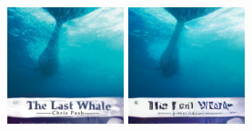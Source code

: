 \begin{figure}[h]
    \centering
    {\small
    }
    \vspace{5pt} 
    
    \begin{minipage}{0.15\textwidth}
        \centering
        \includegraphics[width=\linewidth]{material/origin/2.png}
    \end{minipage}
    \begin{minipage}{0.15\textwidth}
        \centering
        \includegraphics[width=\linewidth]{material/vq/2.png}

\end{minipage}
\end{figure}

